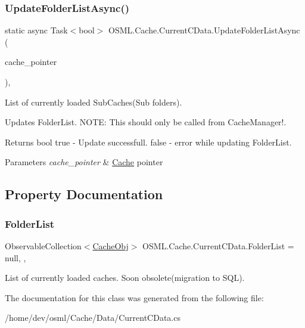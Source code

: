 \subsubsection{\texorpdfstring{UpdateFolderListAsync()}{UpdateFolderListAsync()}}
{\footnotesize\ttfamily static async Task$<$bool$>$ O\+S\+M\+L.\+Cache.\+Current\+C\+Data.\+Update\+Folder\+List\+Async (\begin{DoxyParamCaption}\item[{\mbox{\hyperlink{classOSML_1_1Cache_1_1CPointer}{C\+Pointer}}}]{cache\+\_\+pointer }\end{DoxyParamCaption})\hspace{0.3cm}{\ttfamily [inline]}, {\ttfamily [static]}}



List of currently loaded Sub\+Caches(\+Sub folders). 

Updates Folder\+List. N\+O\+TE\+: This should only be called from Cache\+Manager!. 

\begin{DoxyReturn}{Returns}
bool true -\/ Update successfull. false -\/ error while updating Folder\+List. 
\end{DoxyReturn}

\begin{DoxyParams}{Parameters}
{\em cache\+\_\+pointer} & \mbox{\hyperlink{namespaceOSML_1_1Cache}{Cache}} pointer\\
\hline
\end{DoxyParams}


\subsection{Property Documentation}
\mbox{\label{classOSML_1_1Cache_1_1CurrentCData_ab24556810039e9fa22209438cbf56023}} 
\subsubsection{\texorpdfstring{FolderList}{FolderList}}
{\footnotesize\ttfamily Observable\+Collection$<$\mbox{\hyperlink{classOSML_1_1Cache_1_1CacheObj}{Cache\+Obj}}$>$ O\+S\+M\+L.\+Cache.\+Current\+C\+Data.\+Folder\+List = null\hspace{0.3cm}{\ttfamily [static]}, {\ttfamily [get]}, {\ttfamily [set]}}



List of currently loaded caches. Soon obsolete(migration to S\+Q\+L). 



The documentation for this class was generated from the following file\+:\begin{DoxyCompactItemize}
\item 
/home/dev/osml/\+Cache/\+Data/Current\+C\+Data.\+cs\end{DoxyCompactItemize}
